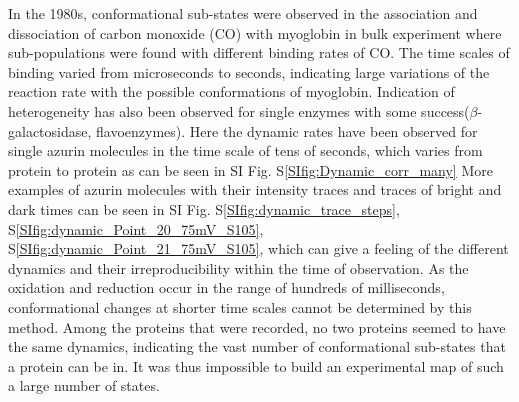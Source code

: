 In the 1980s, conformational sub-states were observed in the association and dissociation of carbon monoxide (CO) with myoglobin in bulk experiment where sub-populations were found with different binding rates of CO.
The time scales of binding varied from microseconds to seconds, indicating large variations of the reaction rate with the possible conformations of myoglobin.
Indication of heterogeneity has also been observed for single enzymes with some success($\beta$-galactosidase, flavoenzymes)\cite{lu1998single-molecule,kou2005single-molecule,english2006ever-fluctuating}.
Here the dynamic rates have been observed for single azurin molecules in the time scale of tens of seconds, which varies from protein to protein as can be seen in SI Fig. S\ref{SIfig:Dynamic_corr_many}
More examples of azurin molecules with their intensity traces and traces of bright and dark times can be seen in SI Fig. S\ref{SIfig:dynamic_trace_steps}, S\ref{SIfig:dynamic_Point_20_75mV_S105}, S\ref{SIfig:dynamic_Point_21_75mV_S105}, which can give a feeling of the different dynamics and their irreproducibility within the time of observation.
As the oxidation and reduction occur in the range of hundreds of milliseconds, conformational changes at shorter time scales cannot be determined by this method.
Among the proteins that were recorded, no two proteins seemed to have the same dynamics, indicating the vast number of conformational sub-states that a protein can be in.
It was thus impossible to build an experimental map of such a large number of states.



